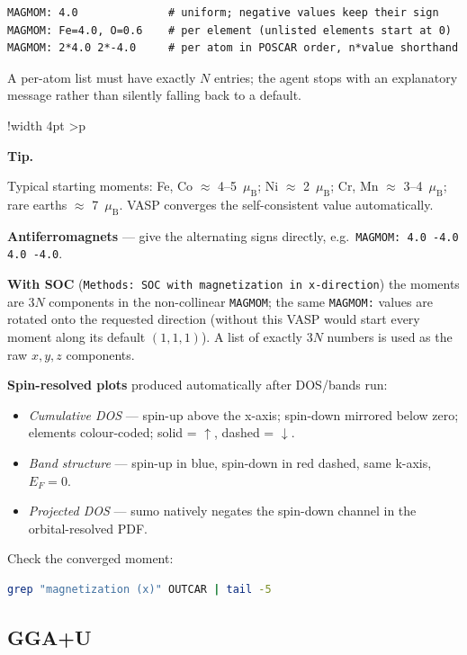 \documentclass[11pt,a4paper]{scrartcl}
\newlength{\boxwidth}
\newenvironment{tipbox}{%
  \par\vspace{6pt}%
  \setlength{\tabcolsep}{5pt}%
  \setlength{\boxwidth}{\dimexpr\linewidth - 4pt - 2\tabcolsep}%
  \noindent\begin{tabular}{!{\color{tipbar}\vrule width 4pt}%
      >{\columncolor{tipbg}}p{\boxwidth}}%
  \rule{0pt}{11pt}\textbf{\textcolor{tipbar}{Tip.}}\enspace\ignorespaces%
}{%
  \rule[-4pt]{0pt}{4pt}%
  \end{tabular}\par\vspace{6pt}%
}
\begin{document}
\begin{lstlisting}
MAGMOM: 4.0              # uniform; negative values keep their sign
MAGMOM: Fe=4.0, O=0.6    # per element (unlisted elements start at 0)
MAGMOM: 2*4.0 2*-4.0     # per atom in POSCAR order, n*value shorthand
\end{lstlisting}

A per-atom list must have exactly $N$ entries; the agent stops with an
explanatory message rather than silently falling back to a default.

\begin{tipbox}
Typical starting moments: Fe, Co $\approx$ 4--5~$\mu_{\mathrm{B}}$;
Ni $\approx$ 2~$\mu_{\mathrm{B}}$; Cr, Mn $\approx$ 3--4~$\mu_{\mathrm{B}}$;
rare earths $\approx$ 7~$\mu_{\mathrm{B}}$.
VASP converges the self-consistent value automatically.
\end{tipbox}

\textbf{Antiferromagnets} --- give the alternating signs directly, e.g.\
\texttt{MAGMOM: 4.0 -4.0 4.0 -4.0}.

\textbf{With SOC} (\texttt{Methods: SOC with magnetization in x-direction})
the moments are $3N$ components in the non-collinear \texttt{MAGMOM}; the
same \texttt{MAGMOM:} values are rotated onto the requested direction
(without this VASP would start every moment along its default $(1,1,1)$).
A list of exactly $3N$ numbers is used as the raw $x,y,z$ components.

\textbf{Spin-resolved plots} produced automatically after DOS/bands run:

\begin{itemize}
  \item \emph{Cumulative DOS} --- spin-up above the x-axis; spin-down
        mirrored below zero; elements colour-coded; solid = $\uparrow$,
        dashed = $\downarrow$.
  \item \emph{Band structure} --- spin-up in blue, spin-down in red
        dashed, same k-axis, $E_F = 0$.
  \item \emph{Projected DOS} --- sumo natively negates the spin-down
        channel in the orbital-resolved PDF.
\end{itemize}

Check the converged moment:
\begin{lstlisting}[language=bash]
grep "magnetization (x)" OUTCAR | tail -5
\end{lstlisting}

\subsection{GGA+U}
\label{sec:ggau}
\end{document}
